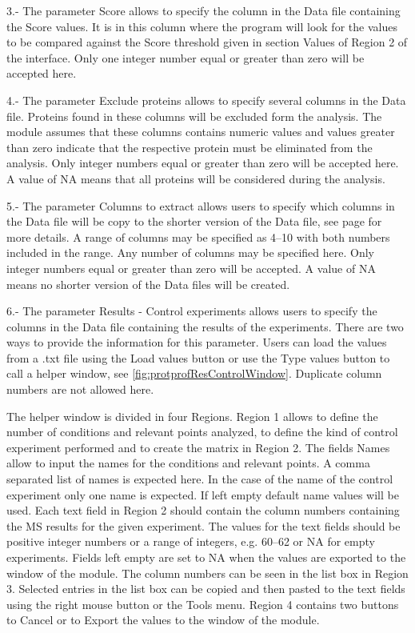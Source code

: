 \num{3}.- The parameter Score allows to specify the column in the Data file containing the Score values.  It is in this column where the program will look for the values to be compared against the Score threshold given in section Values of Region \num{2} of the interface. Only one integer number equal or greater than zero will be accepted here. 

\num{4}.- The parameter Exclude proteins allows to specify several columns in the Data file. Proteins found in these columns will be excluded form the analysis. The module assumes that these columns contains numeric values and values greater than zero indicate that the respective protein must be eliminated from the analysis. Only integer numbers equal or greater than zero will be accepted here. A value of NA means that all proteins will be considered during the analysis. 

\num{5}.- The parameter Columns to extract\label{par:protprofColumnExtract} allows users to specify which columns in the Data file will be copy to the shorter version of the Data file, see page \pageref{subsec:utilShortDF} for more details. A range of columns may be specified as \numrange[range-phrase = --]{4}{10} with both numbers included in the range. Any number of columns may be specified here. Only integer numbers equal or greater than zero will be accepted. A value of NA means no shorter version of the Data files will be created.

\num{6}.-  \label{par:protprofResultControl}The parameter Results - Control experiments allows users to specify the columns in the Data file containing the results of the experiments. There are two ways to provide the information for this parameter. Users can load the values from a .txt file using the Load values button or use the Type values button to call a helper window, see \autoref{fig:protprofResControlWindow}. Duplicate column numbers are not allowed here.

The helper window is divided in four Regions. Region \num{1} allows to define the number of conditions and relevant points analyzed, to define the kind of control experiment performed and to create the matrix in Region \num{2}. The fields Names allow to input the names for the conditions and relevant points. A comma separated list of names is expected here. In the case of the name of the control experiment only one name is expected. If left empty default name values will be used. Each text field in Region \num{2} should contain the column numbers containing the MS results for the given experiment. The values for the text fields should be positive integer numbers or a range of integers, e.g. \numrange[range-phrase=--]{60}{62} or NA for empty experiments. Fields left empty are set to NA when the values are exported to the window of the module. The column numbers can be seen in the list box in Region \num{3}. Selected entries in the list box can be copied and then pasted to the text fields using the right mouse button or the Tools menu. Region \num{4} contains two buttons to Cancel or to Export the values to the window of the module.  

